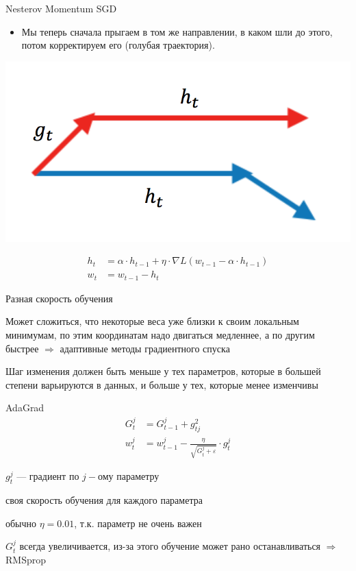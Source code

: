 \documentclass[notes,12pt, aspectratio=169]{beamer}
\newenvironment{wideitemize}{\itemize\addtolength{\itemsep}{10pt}}{\enditemize}
\begin{document}
\begin{frame}{Nesterov Momentum SGD}
\begin{itemize}
\item Мы теперь сначала прыгаем в том же направлении, в каком шли до этого, потом корректируем его (голубая траектория).
\end{itemize}
\begin{center}
\includegraphics[width=.4\linewidth]{nesterov.png}
\end{center}
\begin{equation*}
\begin{aligned}
h_t &= \alpha \cdot h_{t-1} + \eta \cdot \nabla L(w_{t-1} - \alpha \cdot h_{t-1}) \\
w_t &= w_{t-1} - h_t
\end{aligned}	
\end{equation*}
\end{frame}


\begin{frame}{Разная скорость обучения}
\begin{wideitemize}
\item Может сложиться, что некоторые веса уже близки к своим локальным минимумам, по этим координатам надо двигаться медленнее, а по другим быстрее $\Rightarrow$ {\color{red} адаптивные методы градиентного спуска }

\item Шаг изменения должен быть меньше у тех параметров, которые в большей степени варьируются в данных, и больше у тех, которые менее изменчивы 
\end{wideitemize}
\end{frame}


\begin{frame}{AdaGrad}
\begin{equation*}
\begin{aligned}
G_t^j &= G_{t-1}^j + g_{tj}^2 \\
w_t^j &= w_{t-1}^j - \frac{\eta}{\sqrt{G_t^j + \varepsilon}} \cdot g_t^j
\end{aligned}	
\end{equation*}
\begin{wideitemize}
\item  $g_t^j$ — градиент по $j-$ому параметру
\item своя скорость обучения для каждого параметра
\item обычно $\eta = 0.01$, т.к. параметр не очень важен
\item $G_t^j$ всегда увеличивается, из-за этого обучение может рано останавливаться $\Rightarrow$  RMSprop
\end{wideitemize}
\end{frame}
\end{document}
